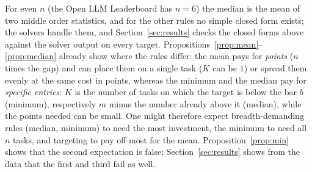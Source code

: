 For even $n$ (the Open LLM Leaderboard has $n=6$) the median is the mean of two middle order statistics, and for the other rules no simple closed form exists; the solvers handle them, and Section~\ref{sec:results} checks the closed forms above against the solver output on every target.
Propositions~\ref{prop:mean}--\ref{prop:median} already show where the rules differ: the mean pays for \emph{points} ($n$ times the gap) and can place them on a single task ($K$ can be $1$) or spread them evenly at the same cost in points, whereas the minimum and the median pay for \emph{specific entries}: $K$ is the number of tasks on which the target is below the bar $b$ (minimum), respectively $m$ minus the number already above it (median), while the points needed can be small. One might therefore expect breadth-demanding rules (median, minimum) to need the most investment, the minimum to need all $n$ tasks, and targeting to pay off most for the mean. Proposition~\ref{prop:min} shows that the second expectation is false; Section~\ref{sec:results} shows from the data that the first and third fail as well.
